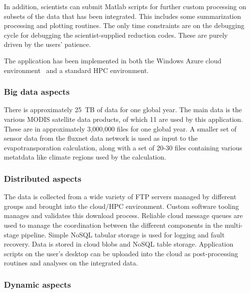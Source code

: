 In addition, scientists can submit Matlab scripts for further custom processing on subsets of
the data that has been integrated. This includes some summarization processing and plotting
routines.  The only time constraints are on the debugging cycle for debugging the scientist-supplied
reduction codes. These are purely driven by the users' patience.

The application has been implemented in both the Windows Azure cloud
environment~\cite{win_azure} and a standard HPC environment.

 \subsubsection*{Big data aspects}



There is approximately 25~TB of data for one global year.  The main data is the various MODIS satellite data
products, of which 11 are used by this application. These are in approximately 3,000,000 files for one global year. A
smaller set of sensor data from the fluxnet data network is used as input to the evapotransporation
calculation, along with a set of 20-30 files containing various metatdata like climate regions used
by the calculation.

 \subsubsection*{Distributed aspects}



 The data is collected from a wide variety of FTP servers managed by
 different groups and brought into the cloud/HPC environment. Custom
 software tooling manages and validates this download
 process. Reliable cloud message queues are used to manage the
 coordination between the different components in the multi-stage
 pipeline. Simple NoSQL tabular storage is used for logging and fault
 recovery. Data is stored in cloud blobs and NoSQL table
 storage. Application scripts on the user's desktop can be uploaded
 into the cloud as post-processing routines and analyses on the
 integrated data.

 \subsubsection*{Dynamic aspects}


